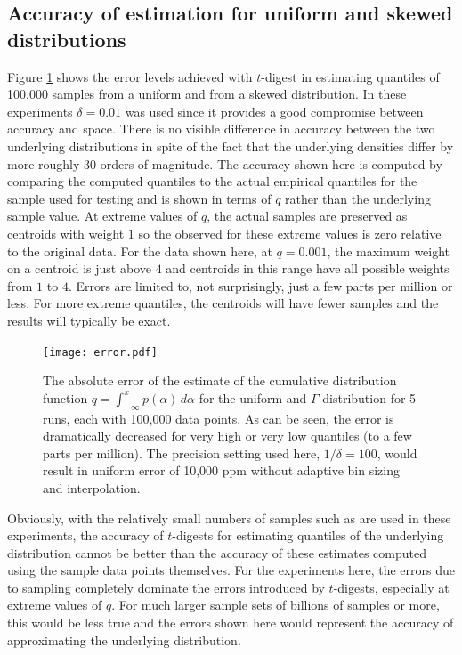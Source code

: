 \documentclass[11pt]{amsart}
\begin{document}
\subsection{Accuracy of estimation for uniform and skewed distributions}
Figure \ref{fig:uniform-error} shows the error levels achieved with $t$-digest in estimating quantiles of 100,000 samples from a uniform and from a skewed distribution.  In these experiments $\delta=0.01$ was used since it provides a good compromise between accuracy and space.  There is no visible difference in accuracy between the two underlying distributions in spite of the fact that the underlying densities differ by more roughly 30 orders of magnitude.  The accuracy shown here is computed by comparing the computed quantiles to the actual empirical quantiles for the sample used for testing and is shown in terms of $q$ rather than the underlying sample value.  At extreme values of $q$, the actual samples are preserved as centroids with weight $1$ so the observed for these extreme values is zero relative to the original data.  For the data shown here, at $q=0.001$, the maximum weight on a centroid is just above $4$ and centroids in this range have all possible weights from $1$ to $4$.  Errors are limited to, not surprisingly, just a few parts per million or less.  For more extreme quantiles, the centroids will have fewer samples and the results will typically be exact.
\begin{figure}[htb] %
   \texttt{[image: error.pdf]} 
   \caption{The absolute error of the estimate of the cumulative distribution function $q = \int_{-\infty}^x p(\alpha) \, d\alpha$ for the uniform and $\Gamma$ distribution for 5 runs, each with 100,000 data points.  As can be seen, the error is dramatically decreased for very high or very low quantiles (to a few parts per million).  The precision setting used here, $1/\delta = 100$, would result in uniform error of 10,000 ppm without adaptive bin sizing and interpolation.}
   \label{fig:uniform-error}
\end{figure}

Obviously, with the relatively small numbers of samples such as are used in these experiments, the accuracy of $t$-digests for estimating quantiles of the underlying distribution cannot be better than the accuracy of these estimates computed using the sample data points themselves.  For the experiments here, the errors due to sampling completely dominate the errors introduced by $t$-digests, especially at extreme values of $q$.  For much larger sample sets of billions of samples or more, this would be less true and the errors shown here would represent the accuracy of approximating the underlying distribution.
\end{document}
